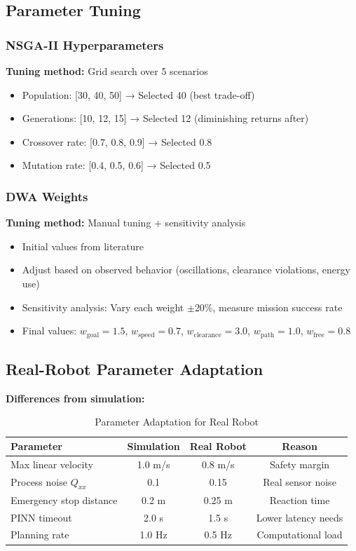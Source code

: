 \subsection{Parameter Tuning}

\subsubsection{NSGA-II Hyperparameters}

\textbf{Tuning method:} Grid search over 5 scenarios
\begin{itemize}
    \item Population: [30, 40, 50] → Selected 40 (best trade-off)
    \item Generations: [10, 12, 15] → Selected 12 (diminishing returns after)
    \item Crossover rate: [0.7, 0.8, 0.9] → Selected 0.8
    \item Mutation rate: [0.4, 0.5, 0.6] → Selected 0.5
\end{itemize}

\subsubsection{DWA Weights}

\textbf{Tuning method:} Manual tuning + sensitivity analysis
\begin{itemize}
    \item Initial values from literature
    \item Adjust based on observed behavior (oscillations, clearance violations, energy use)
    \item Sensitivity analysis: Vary each weight $\pm$20\%, measure mission success rate
    \item Final values: $w_{\text{goal}}=1.5$, $w_{\text{speed}}=0.7$, $w_{\text{clearance}}=3.0$, $w_{\text{path}}=1.0$, $w_{\text{free}}=0.8$
\end{itemize}

\subsection{Real-Robot Parameter Adaptation}

\textbf{Differences from simulation:}
\begin{table}[h]
\centering
\caption{Parameter Adaptation for Real Robot}
\label{tab:real_robot_params}
\begin{tabular}{lccc}
\toprule
\textbf{Parameter} & \textbf{Simulation} & \textbf{Real Robot} & \textbf{Reason} \\
\midrule
Max linear velocity & 1.0 m/s & 0.8 m/s & Safety margin \\
Process noise $Q_{xx}$ & 0.1 & 0.15 & Real sensor noise \\
Emergency stop distance & 0.2 m & 0.25 m & Reaction time \\
PINN timeout & 2.0 s & 1.5 s & Lower latency needs \\
Planning rate & 1.0 Hz & 0.5 Hz & Computational load \\
\bottomrule
\end{tabular}
\end{table}

